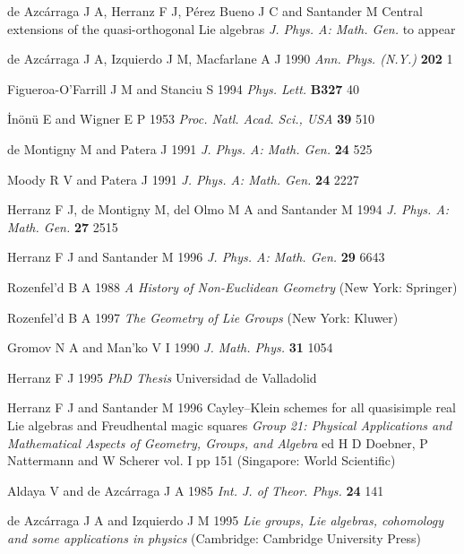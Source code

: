 \documentclass[12pt]{article}
\begin{document}
\begin{thebibliography}{30}

de Azc\'arraga J A,   Herranz F J,   P\'erez Bueno J C  and
Santander M  {Central extensions of the quasi-orthogonal Lie algebras}
{\em J. Phys. A: Math. Gen.} to appear

de Azc\'arraga J A, Izquierdo J M, Macfarlane A J 1990
{\em Ann. Phys. (N.Y.)} {\bf 202} 1

Figueroa-O'Farrill J M and Stanciu S 1994 {\em Phys. Lett.} {\bf B327} 40

\.In\"on\"u  E  and   Wigner E P 1953 {\em Proc. Natl.
Acad. Sci., USA}  {\bf 39}  510

   de Montigny M  and     Patera J 1991
{\em J. Phys. A: Math. Gen.} {\bf 24}   525

 Moody  R V  and    Patera J 1991
{\em J. Phys. A: Math. Gen.}  {\bf 24}  2227

  Herranz F J,   de Montigny M,   del Olmo M A   and   Santander M
1994 {\em J. Phys. A: Math. Gen.}  {\bf 27}  2515

  Herranz F J and   Santander M 1996
{\em J. Phys. A: Math. Gen.}  {\bf 29} 6643

    Rozenfel'd B A 1988
{\em A History of Non-Euclidean Geometry} (New York: Springer)

    Rozenfel'd B A 1997
{\em The Geometry of Lie Groups} (New York: Kluwer)

  Gromov N A and   Man'ko V I 1990 {\em J. Math. Phys.} {\bf 31}  1054

  Herranz F J 1995 {\em PhD Thesis}  Universidad de Valladolid

  Herranz F J and  Santander M 1996
{Cayley--Klein  schemes for all quasisimple real Lie algebras
  and Freudhental magic squares}
{\em Group  21: Physical Applications and Mathematical Aspects of Geometry,
Groups, and  Algebra} ed  H D  Doebner, P Nattermann  and W Scherer
  vol. I  pp 151  (Singapore: World Scientific)

 Aldaya V and   de Azc\'arraga J A 1985
{\em Int. J. of Theor. Phys.} {\bf 24}  141

  de Azc\'arraga J A and  Izquierdo J M 1995
{\em Lie groups, Lie algebras, cohomology and some applications in
  physics}   (Cambridge: Cambridge  University Press)

\end{thebibliography}
\end{document}
